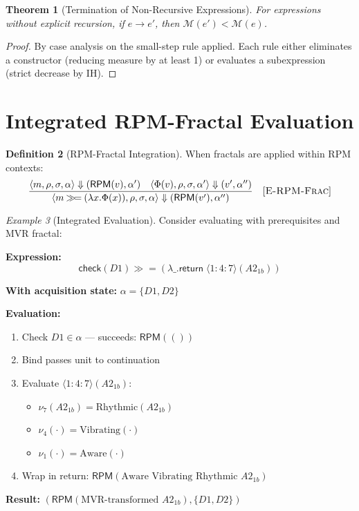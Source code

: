 \documentclass[11pt,twoside,openright]{book}
\theoremstyle{definition}
\newtheorem{definition}{Definition}[chapter]
\theoremstyle{plain}
\newtheorem{theorem}[definition]{Theorem}
\theoremstyle{remark}
\newtheorem{example}[definition]{Example}
\newcommand{\noe}[1]{\nu_{#1}}
\newcommand{\rpmret}{\mathsf{return}}
\newcommand{\rpmbind}{\mathbin{\gg\!=}}
\newcommand{\Frac}{\Phi}
\newcommand{\smallstep}{\to}
\newcommand{\bigstep}{\Downarrow}
\begin{document}
\begin{theorem}[Termination of Non-Recursive Expressions]
\label{thm:termination}
For expressions without explicit recursion, if $e \smallstep e'$, then $\mathcal{M}(e') < \mathcal{M}(e)$.
\end{theorem}

\begin{proof}
By case analysis on the small-step rule applied. Each rule either eliminates a constructor (reducing measure by at least 1) or evaluates a subexpression (strict decrease by IH).
\end{proof}

\section{Integrated RPM-Fractal Evaluation}

\begin{definition}[RPM-Fractal Integration]
\label{def:rpm-fractal-integration}
When fractals are applied within RPM contexts:
\[
\frac{\langle m, \rho, \sigma, \alpha \rangle \bigstep (\mathsf{RPM}(v), \alpha') \quad \langle \Frac(v), \rho, \sigma, \alpha' \rangle \bigstep (v', \alpha'')}{\langle m \rpmbind (\lambda x. \Frac(x)), \rho, \sigma, \alpha \rangle \bigstep (\mathsf{RPM}(v'), \alpha'')} \quad [\textsc{E-RPM-Frac}]
\]
\end{definition}

\begin{example}[Integrated Evaluation]
\label{ex:integrated-eval}
Consider evaluating with prerequisites and MVR fractal:

\textbf{Expression:}
\[
\mathsf{check}(D1) \rpmbind (\lambda \_. \rpmret\; \langle 1:4:7 \rangle(A2_{1b}))
\]

\textbf{With acquisition state:} $\alpha = \{D1, D2\}$

\textbf{Evaluation:}
\begin{enumerate}
\item Check $D1 \in \alpha$ — succeeds: $\mathsf{RPM}(())$
\item Bind passes unit to continuation
\item Evaluate $\langle 1:4:7 \rangle(A2_{1b})$:
  \begin{itemize}
  \item $\noe{7}(A2_{1b}) = \text{Rhythmic}(A2_{1b})$
  \item $\noe{4}(\cdot) = \text{Vibrating}(\cdot)$
  \item $\noe{1}(\cdot) = \text{Aware}(\cdot)$
  \end{itemize}
\item Wrap in return: $\mathsf{RPM}(\text{Aware Vibrating Rhythmic } A2_{1b})$
\end{enumerate}

\textbf{Result:} $(\mathsf{RPM}(\text{MVR-transformed } A2_{1b}), \{D1, D2\})$
\end{example}
\end{document}
